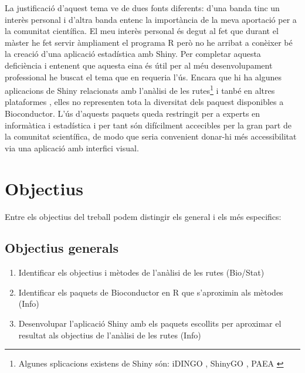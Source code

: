 La justificació d'aquest tema ve de dues fonts diferents: d'una banda tinc un interès personal i d'altra banda entenc la importància de la meva aportació per a la comunitat científica. El meu interès personal és degut al fet que durant el màster he fet servir àmpliament el programa R però no he arribat a conèixer bé la creació d'una aplicació estadística amb Shiny. Per completar aquesta deficiència i entenent que aquesta eina és útil per al méu desenvolupament professional he buscat el tema que en requeria l'ús. Encara que hi ha algunes aplicacions de Shiny relacionats amb l'anàlisi de les rutes\footnote{Algunes splicacions existens de Shiny són: iDINGO \cite{class2017idingo}, ShinyGO \cite{ge2018shinygo}, PAEA \cite{clark2015principle}} i tanbé en altres plataformes \cite{reimand2019pathway}, elles no representen tota la diversitat dels paquest disponibles a Bioconductor. L'ús d'aquests paquets queda restringit per a experts en informàtica i estadística i per tant són difícilment accecibles per la gran part de la comunitat scientífica, de modo que seria convenient donar-hi més accessibilitat via una aplicació amb interfici visual. 


\section{Objectius}

Entre els objectius del treball podem distingir els general i els més especifics:
 
\subsection{Objectius generals}
\begin{enumerate}
\item Identificar els objectius i mètodes de l'anàlisi de les rutes (Bio/Stat)
\item Identificar els paquets de Bioconductor en R que s'aproximin als mètodes (Info)
\item Desenvolupar l'aplicació Shiny  amb els paquets escollits per aproximar el resultat als objectius de l'anàlisi de les rutes  (Info)
\end{enumerate}

